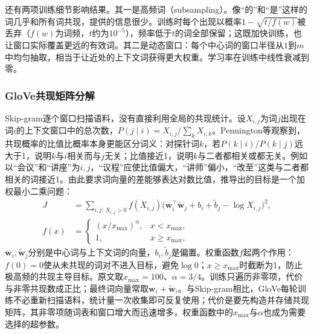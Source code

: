 还有两项训练细节影响结果。其一是高频词（subsampling）。像“的”和“是”这样的词几乎和所有词共现，提供的信息很少。训练时每个出现以概率$1-\sqrt{t/f(w)}$被丢弃（$f(w)$为词频，$t$约为$10^{-5}$），频率低于$t$的词全部保留；这既加快训练，也让窗口实际覆盖更远的有效词。其二是动态窗口：每个中心词的窗口半径从$1$到$m$中均匀抽取，相当于让近处的上下文词获得更大权重。学习率在训练中线性衰减到零。

\subsubsection{GloVe共现矩阵分解}
\label{sec:nlp-classical-glove}

Skip-gram逐个窗口扫描语料，没有直接利用全局的共现统计。设$X_{i,j}$为词$j$出现在词$i$的上下文窗口中的总次数，$P(j\mid i)=X_{i,j}/\sum_kX_{i,k}$。Pennington等观察到，共现概率的比值比概率本身更能区分词义：对探针词$k$，若$P(k\mid i)/P(k\mid j)$远大于1，说明$k$与$i$相关而与$j$无关；比值接近1，说明$k$与二者都相关或都无关。例如以“会议”和“讲座”为$i,j$，“议程”应使比值偏大，“讲师”偏小，“改至”这类与二者都相关的词接近1。由此要求词向量的差能够表达对数比值，推导出的目标是一个加权最小二乘问题：
\begin{equation}
  \begin{aligned}
    J&=\sum_{i,j:\,X_{i,j}>0}f(X_{i,j})\bigl(\bm w_i^{\top}\tilde{\bm w}_j+b_i+\tilde b_j-\log X_{i,j}\bigr)^2,\\
    f(x)&=\begin{cases}(x/x_{\max})^{\alpha},&x<x_{\max},\\1,&x\geq x_{\max},\end{cases}
  \end{aligned}
  \label{eq:nlp-classical-glove}
\end{equation}
$\bm w_i,\tilde{\bm w}_j$分别是中心词与上下文词的向量，$b_i,\tilde b_j$是偏置。权重函数$f$起两个作用：$f(0)=0$使从未共现的词对不进入目标，避免$\log0$；$x\geq x_{\max}$时截断为1，防止极高频的共现主导目标。原文取$x_{\max}=100$、$\alpha=3/4$。训练只遍历非零项，代价与非零共现数成正比；最终词向量常取$\bm w_i+\tilde{\bm w}_i$。与Skip-gram相比，GloVe每轮训练不必重新扫描语料，统计量一次收集即可反复使用；代价是要先构造并存储共现矩阵，其非零项随词表和窗口增大而迅速增多，权重函数中的$x_{\max}$与$\alpha$也成为需要选择的超参数。

